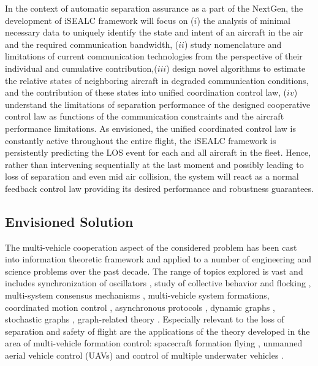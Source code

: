 \documentclass[letter,onecolumn,12pt]{aiaa-tc}
\newcommand{\1}{1_n}
\begin{document}
In the context of automatic separation assurance as a part of the NextGen, the development of iSEALC framework will focus on ($i$) the analysis of  minimal necessary data to uniquely identify the state and intent of an aircraft in the air and the required communication bandwidth, ($ii$) study nomenclature and limitations of current communication technologies from the perspective of their individual and cumulative contribution,($iii$) design novel algorithms to estimate the relative states of  neighboring aircraft in degraded communication conditions, and the contribution of these states into unified coordination control law, ($iv$) understand the limitations of separation performance of the designed cooperative control law as functions of the communication constraints and the aircraft performance limitations. As envisioned, the unified coordinated control law is constantly active throughout the entire flight, the iSEALC framework is persistently predicting the LOS event for each and all aircraft in the fleet. Hence, rather than intervening sequentially at the last moment and possibly leading to loss of separation and even mid air collision, the system will react as a normal feedback control law providing its desired performance and robustness guarantees.

\subsection{Envisioned Solution}
\label{subsec:envisioned_solution}
The multi-vehicle cooperation aspect of the considered problem has been cast into information theoretic framework and applied to a number of engineering and science problems over the past decade. The range of topics explored is vast and includes synchronization of oscillators \cite{Sepulchre}, study of collective behavior and flocking
\cite{jadbabaie03}, multi-system consensus mechanisms \cite{lin05}, multi-vehicle system formations\cite{egerstedt01},
coordinated motion control \cite{ghabcheloo06}, asynchronous protocols \cite{Fang}, dynamic graphs \cite{mesbahi},
stochastic graphs \cite{mesbahi, Stilwell, Stilwell2}, graph-related theory \cite{caom, Kim-Meshabi}.
Especially relevant to the loss of separation and safety of flight are the applications of the theory developed in the area of multi-vehicle formation control: spacecraft formation flying \cite{mesbahi-hadaegh}, unmanned aerial vehicle control (UAVs) \cite{Song, Stipanovic}and control of multiple underwater vehicles \cite{pereira}.
\end{document}
